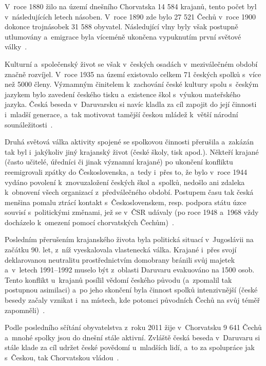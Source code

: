 V~roce 1880 žilo na území dnešního Chorvatska 14 584 krajanů, tento počet byl v~následujících letech násoben. V~roce 1890 zde bylo 27 521 Čechů v~roce 1900 dokonce trojnásobek 31 588 obyvatel. Následující vlny byly však postupně utlumovány a~emigrace byla víceméně ukončena vypuknutím první světové války~\parencite{Stranjik2017}.

Kulturní a~společenský život se však v~českých osadách v~meziválečném období značně rozvíjel. V~roce 1935 na území existovalo celkem 71 českých spolků s~více než 5000 členy. Významným činitelem k~zachování české kultury spolu s~českým jazykem bylo zavedení českého tisku a~existence škol s~výukou mateřského jazyka. Česká beseda v~Daruvarsku si navíc kladla za cíl zapojit do její činnosti i~mladší generace, a~tak motivovat tamější českou mládež k~větší národní sounáležitosti~\parencite{Preissova2020}.

Druhá světová válka aktivity spojené se spolkovou činnosti přerušila a~zakázán tak byl i~jakýkoliv jiný krajanský život (české školy, tisk apod.). Někteří krajané (často učitelé, úředníci či jinak významní krajané) po ukončení konfliktu reemigrovali zpátky do Československa, a~tedy i~přes to, že bylo v~roce 1944 vydáno povolení k~znovuzaložení českých škol a~spolků, nedošlo ani zdaleka k~obnovení všech organizací z~předválečného období. Postupem času tak česká menšina pomalu ztrácí kontakt s~Československem, resp. podpora státu úzce souvisí s~politickými změnami, jež se v~ČSR udávaly (po roce 1948 a~1968 vždy docházelo k~omezení pomocí chorvatských Čechům)~\parencite{Preissova2020}.

Posledním přerušením krajanského života byla politická situací v~Jugoslávii na začátku 90. let, z~níž vyeskalovala vlastenecká válka. Krajané i~přes svojí deklarovanou neutralitu prostřednictvím domobrany bránili svůj majetek a~v~letech 1991--1992 muselo být z~oblasti Daruvaru evakuováno na 1500 osob. Tento konflikt u~krajanů posílil vědomí českého původu (a~zpomalil tak postupnou asimilaci) a~po jeho skončení byla činnost spolků intenzivnější (české besedy začaly vznikat i~na místech, kde potomci původních Čechů na svůj téměř zapomněli)~\parencite{Stranjik2017}.

Podle posledního sčítání obyvatelstva z~roku 2011 žije v~Chorvatsku 9 641 Čechů a~mnohé spolky jsou do dnešní stále aktivní. Zvláště česká beseda v~Daruvaru si stále klade za cíl udržet české povědomí u~mladších lidí, a~to za spolupráce jak s~Českou, tak Chorvatskou vládou~\parencite{Kokaisl2012}.


